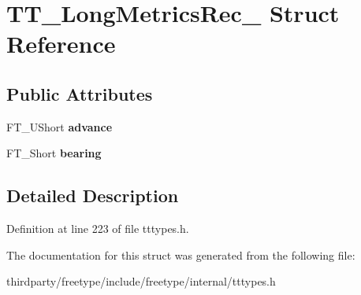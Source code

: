 \hypertarget{struct_t_t___long_metrics_rec__}{}\section{T\+T\+\_\+\+Long\+Metrics\+Rec\+\_\+ Struct Reference}
\label{struct_t_t___long_metrics_rec__}
\subsection*{Public Attributes}
\begin{DoxyCompactItemize}
\item 
\mbox{\label{struct_t_t___long_metrics_rec___a47100e42b52486bc374f80ed2795361d}} 
F\+T\+\_\+\+U\+Short {\bfseries advance}
\item 
\mbox{\label{struct_t_t___long_metrics_rec___a0d74e3eb8611b0a5e89e338af35be4da}} 
F\+T\+\_\+\+Short {\bfseries bearing}
\end{DoxyCompactItemize}


\subsection{Detailed Description}


Definition at line 223 of file tttypes.\+h.



The documentation for this struct was generated from the following file\+:\begin{DoxyCompactItemize}
\item 
thirdparty/freetype/include/freetype/internal/tttypes.\+h\end{DoxyCompactItemize}

